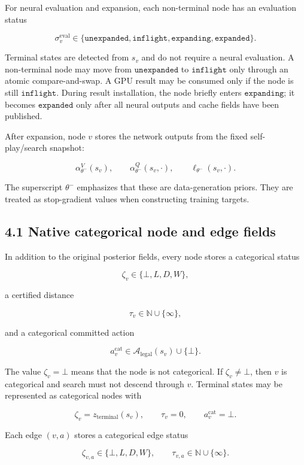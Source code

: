\documentclass[11pt]{article}
\newcommand{\Legal}{\mathcal{A}_{\mathrm{legal}}}
\newcommand{\N}{\mathbb{N}}
\begin{document}
For neural evaluation and expansion, each non-terminal node has an evaluation
status

\[
\sigma^{\mathrm{eval}}_v
\in
\{\texttt{unexpanded},\texttt{inflight},\texttt{expanding},\texttt{expanded}\}.
\]

Terminal states are detected from \(s_v\) and do not require a neural evaluation.
A non-terminal node may move from \(\texttt{unexpanded}\) to
\(\texttt{inflight}\) only through an atomic compare-and-swap. A GPU result may
be consumed only if the node is still \(\texttt{inflight}\). During result
installation, the node briefly enters \(\texttt{expanding}\); it becomes
\(\texttt{expanded}\) only after all neural outputs and cache fields have been
published.

After expansion, node \(v\) stores the network outputs from the fixed
self-play/search snapshot:

\[
\alpha_{\theta^-}^V(s_v),
\qquad
\alpha_{\theta^-}^Q(s_v,\cdot),
\qquad
\ell_{\theta^-}(s_v,\cdot).
\]

The superscript \(\theta^-\) emphasizes that these are data-generation priors.
They are treated as stop-gradient values when constructing training targets.

\subsection*{4.1 Native categorical node and edge fields}

In addition to the original posterior fields, every node stores a categorical
status

\[
\zeta_v\in\{\bot,L,D,W\},
\]

a certified distance

\[
\tau_v\in\N\cup\{\infty\},
\]

and a categorical committed action

\[
a_v^{\mathrm{cat}}\in\Legal(s_v)\cup\{\bot\}.
\]

The value \(\zeta_v=\bot\) means that the node is not categorical. If
\(\zeta_v\ne\bot\), then \(v\) is categorical and search must not descend
through \(v\). Terminal states may be represented as categorical nodes with

\[
\zeta_v=z_{\mathrm{terminal}}(s_v),
\qquad
\tau_v=0,
\qquad
a_v^{\mathrm{cat}}=\bot.
\]

Each edge \((v,a)\) stores a categorical edge status

\[
\zeta_{v,a}\in\{\bot,L,D,W\},
\qquad
\tau_{v,a}\in\N\cup\{\infty\}.
\]
\end{document}
